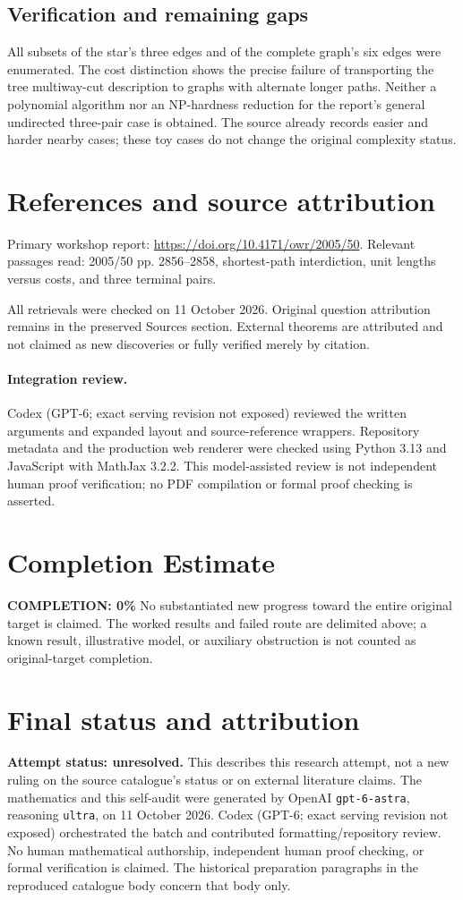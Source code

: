 \documentclass[11pt]{article}
\begin{document}
\subsection{Verification and remaining gaps}
All subsets of the star's three edges and of the complete graph's six edges were enumerated. The cost distinction shows the precise failure of transporting the tree multiway-cut description to graphs with alternate longer paths. Neither a polynomial algorithm nor an NP-hardness reduction for the report's general undirected three-pair case is obtained. The source already records easier and harder nearby cases; these toy cases do not change the original complexity status.

\section{References and source attribution}
Primary workshop report: \url{https://doi.org/10.4171/owr/2005/50}. Relevant passages read: 2005/50 pp. 2856--2858, shortest-path interdiction, unit lengths versus costs, and three terminal pairs.

All retrievals were checked on 11 October 2026. Original question attribution remains in the preserved Sources section. External theorems are attributed and not claimed as new discoveries or fully verified merely by citation.


\paragraph{Integration review.} Codex (GPT-6; exact serving revision not exposed) reviewed the written arguments and expanded layout and source-reference wrappers. Repository metadata and the production web renderer were checked using Python 3.13 and JavaScript with MathJax 3.2.2. This model-assisted review is not independent human proof verification; no PDF compilation or formal proof checking is asserted.

\section{Completion Estimate}
\noindent\textbf{COMPLETION: 0\%}
No substantiated new progress toward the entire original target is claimed. The worked results and failed route are delimited above; a known result, illustrative model, or auxiliary obstruction is not counted as original-target completion.

\section{Final status and attribution}
\textbf{Attempt status: unresolved.} This describes this research attempt, not a new ruling on the source catalogue's status or on external literature claims.
The mathematics and this self-audit were generated by OpenAI \texttt{gpt-6-astra}, reasoning \texttt{ultra}, on 11 October 2026. Codex (GPT-6; exact serving revision not exposed) orchestrated the batch and contributed formatting/repository review. No human mathematical authorship, independent human proof checking, or formal verification is claimed. The historical preparation paragraphs in the reproduced catalogue body concern that body only.
\end{document}
